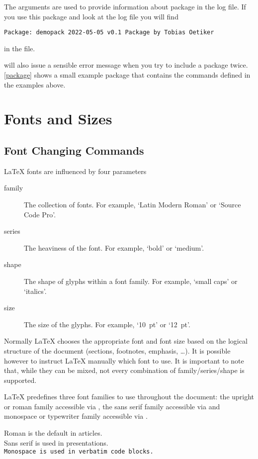 The arguments are used to provide information about package in the log file. If
you use this package and look at the log file you will find
\begin{verbatim}
Package: demopack 2022-05-05 v0.1 Package by Tobias Oetiker
\end{verbatim}
in the  file.

 will also issue a sensible error message when you try
to include a package twice. \autoref{package} shows a small example package
that contains the commands defined in the examples above.

\section{Fonts and Sizes}\label{sec:fontsize}

\subsection{Font Changing Commands}

\LaTeX{} fonts are influenced by four parameters
\begin{description}
  \item[family] The collection of fonts. For example, \enquote*{Latin Modern
      Roman} or \enquote*{Source Code Pro}.
  \item[series] The heaviness of the font. For example, \enquote*{bold} or
    \enquote*{medium}.
  \item[shape] The shape of glyphs within a font family. For example,
    \enquote*{small caps} or \enquote*{italics}.
  \item[size] The size of the glyphs. For example, \enquote*{\qty{10}{pt}} or
    \enquote*{\qty{12}{pt}}.
\end{description}
Normally \LaTeX{} chooses the appropriate font and font size based on the
logical structure of the document (sections, footnotes, emphasis, \ldots). It
is possible however to instruct \LaTeX{} manually which font to use. It is
important to note that, while they can be mixed, not every combination of
family\slash{}series\slash{}shape is supported.

\LaTeX{} predefines three font families to use throughout the document: the
upright or roman family accessible via , the \textsf{sans serif
  family} accessible via  and monospace or typewriter family
accessible via .
\begin{example}
\textrm{Roman is the default
  in articles.} \\
\textsf{Sans serif is used in
  presentations.} \\
\texttt{Monospace is used in
  verbatim code blocks.}
\end{example}


